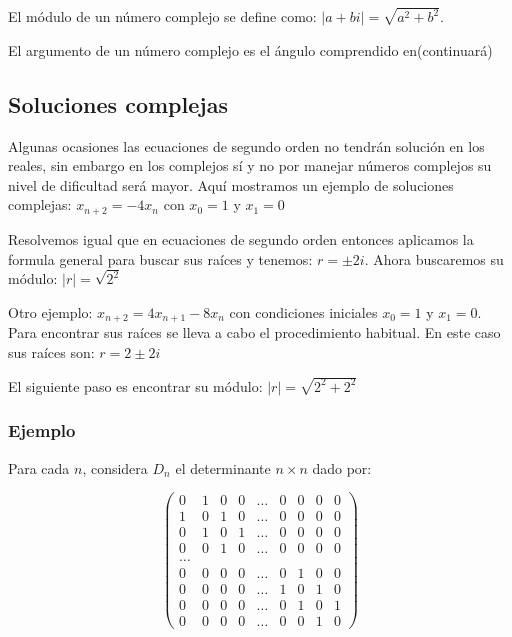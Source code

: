 \documentclass{article}
\begin{document}
El módulo de un número complejo se define como: $|a+bi|=\sqrt{a^2+b^2}$.

El argumento de un número complejo es el ángulo comprendido en(continuará)


\subsection{Soluciones complejas}
\label{sec:complejas}

Algunas ocasiones las ecuaciones de segundo orden no tendrán solución
en los reales, sin embargo en los complejos sí y no por manejar
números complejos su nivel de dificultad será mayor. Aquí mostramos un
ejemplo de soluciones complejas: $x_{n+2}=-4x_{n}$ con $x_0=1$ y
$x_1=0$

Resolvemos igual que en ecuaciones de segundo orden entonces aplicamos
la formula general para buscar sus raíces y tenemos: $r=\pm2i$.
Ahora buscaremos su módulo: $|r|=\sqrt{2^2}$

 
Otro ejemplo: $x_{n+2}=4x_{n+1}-8x_n$ con condiciones iniciales
$x_0=1$ y $x_1=0$. Para encontrar sus raíces se lleva a cabo el
procedimiento habitual. En este caso sus raíces son: $r=2\pm2i$

El siguiente paso es encontrar su módulo: $|r|=\sqrt{2^2+2^2}$


\subsubsection{Ejemplo}

Para cada $n$, considera $D_{n}$ el determinante $n\times n$ dado por:

\begin{equation*}
\begin{pmatrix}
0 & 1 & 0 & 0 &\ldots & 0 & 0 & 0 & 0\\
1 & 0 & 1 & 0 &\ldots & 0 & 0 & 0 & 0\\
0 & 1 & 0 & 1 &\ldots & 0 & 0 & 0 & 0\\
0 & 0 & 1 & 0 &\ldots & 0 & 0 & 0 & 0\\
\ldots\\
0 & 0 & 0 & 0 &\ldots & 0 & 1 & 0 & 0\\
0 & 0 & 0 & 0 &\ldots & 1 & 0 & 1 & 0\\
0 & 0 & 0 & 0 &\ldots & 0 & 1 & 0 & 1\\
0 & 0 & 0 & 0 &\ldots & 0 & 0 & 1 & 0
\end{pmatrix}
\end{equation*}
\end{document}
